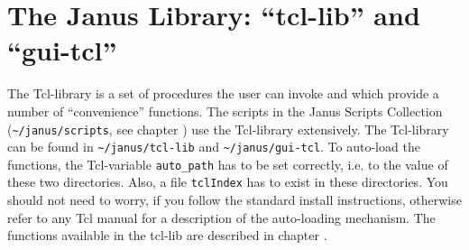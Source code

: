 

\section{The Janus Library: ``tcl-lib'' and ``gui-tcl''}

The Tcl-library is  a set of procedures  the user can invoke and which
provide  a number of ``convenience''  functions.   The scripts in  the
Janus  Scripts Collection  (\texttt{\~{ }/janus/scripts},  see chapter
)  use      the    Tcl-library extensively.   The
Tcl-library   can  be   found   in   \texttt{\~{ }/janus/tcl-lib}  and
\texttt{\~{ }/janus/gui-tcl}.   To  auto-load   the  functions,  the
Tcl-variable \texttt{auto\_path} has to be set correctly, i.e.  to the
value of these two directories. Also, a  file \texttt{tclIndex} has to
exist   in these directories. You  should  not need to   worry, if you
follow  the standard install instructions,  otherwise refer to any Tcl
manual for a description of the auto-loading mechanism.  The functions
available in the tcl-lib are described in chapter .

